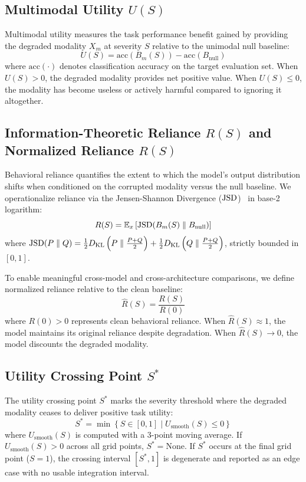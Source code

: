 \subsection{Multimodal Utility $U(S)$}
Multimodal utility measures the task performance benefit gained by providing the degraded modality $X_m$ at severity $S$ relative to the unimodal null baseline:
\begin{equation}
U(S) = \text{acc}(B_m(S)) - \text{acc}(B_{\text{null}})
\end{equation}
where $\text{acc}(\cdot)$ denotes classification accuracy on the target evaluation set.
When $U(S) > 0$, the degraded modality provides net positive value. When $U(S) \le 0$, the modality has become useless or actively harmful compared to ignoring it altogether.

\subsection{Information-Theoretic Reliance $R(S)$ and Normalized Reliance $\hat{R}(S)$}
Behavioral reliance quantifies the extent to which the model's output distribution shifts when conditioned on the corrupted modality versus the null baseline. We operationalize reliance via the Jensen-Shannon Divergence ($\text{JSD}$)~\cite{lin1991divergence} in base-2 logarithm:
\begin{equation}
R(S) = \mathbb{E}_x \left[ \text{JSD}(B_m(S) \parallel B_{\text{null}}) \right]
\end{equation}
where $\text{JSD}(P \parallel Q) = \frac{1}{2} D_{\text{KL}}\left(P \parallel \frac{P+Q}{2}\right) + \frac{1}{2} D_{\text{KL}}\left(Q \parallel \frac{P+Q}{2}\right)$, strictly bounded in $[0, 1]$.

To enable meaningful cross-model and cross-architecture comparisons, we define normalized reliance relative to the clean baseline:
\begin{equation}
\hat{R}(S) = \frac{R(S)}{R(0)}
\end{equation}
where $R(0) > 0$ represents clean behavioral reliance. When $\hat{R}(S) \approx 1$, the model maintains its original reliance despite degradation. When $\hat{R}(S) \to 0$, the model discounts the degraded modality.

\subsection{Utility Crossing Point $S^*$}
The utility crossing point $S^*$ marks the severity threshold where the degraded modality ceases to deliver positive task utility:
\begin{equation}
S^* = \min \left\{ S \in [0, 1] \mid U_{\text{smooth}}(S) \le 0 \right\}
\end{equation}
where $U_{\text{smooth}}(S)$ is computed with a 3-point moving average. If $U_{\text{smooth}}(S) > 0$ across all grid points, $S^* = \text{None}$. If $S^*$ occurs at the final grid point ($S=1$), the crossing interval $[S^*, 1]$ is degenerate and reported as an edge case with no usable integration interval.

